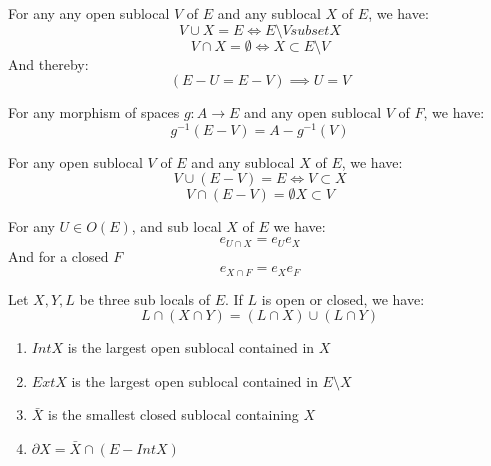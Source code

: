 \begin{lemma}
    \label{lem:properties_of_complements}
    For any any open sublocal $V$ of $E$ and any sublocal $X$ of $E$, we have:
    \[V \cup X = E \iff E \setminus V subset X\]
    \[V \cap X = \emptyset \iff X \subset E \setminus V\]
    And thereby:
    \[(E - U = E - V) \implies U = V\]
\end{lemma}

\begin{lemma}
    \label{lem:preimage_of_complements}
    For any morphism of spaces $g: A \to E$ and any open sublocal $V$ of $F$, we have:
    \[g^{-1}(E - V) = A - g^{-1}(V)\]
\end{lemma}

\begin{lemma}
    \label{lem:properties_of_complements_part_2}
    For any open sublocal $V$ of $E$ and any sublocal $X$ of $E$, we have:
    \[V \cup (E - V) = E \iff V \subset X \]
    \[V \cap (E - V) = \emptyset X \subset V\]
\end{lemma}


\begin{lemma}
    \label{lem:nucleus_and_intersection}
    For any $U \in O(E)$, and sub local $X$ of $E$ we have:
    \[e_{U \cap X} = e_Ue_X\]
    And for a closed $F$
    \[e_{X \cap F} = e_Xe_F\]
\end{lemma}

\begin{lemma}
    \label{lem:distribution_of_intersections_over_unions}
    Let $X, Y, L$ be three sub locals of $E$. If $L$ is open or closed, we have:
    \[L \cap (X \cap Y) = (L \cap X) \cup (L \cap Y)\]
\end{lemma}

\begin{definition}
    \label{def:further_topology}
    \begin{enumerate}
        \item $Int X$ is the largest open sublocal contained in $X$
        \item $Ext X$ is the largest open sublocal contained in $E \setminus X$
        \item $\bar{X}$ is the smallest closed sublocal containing $X$
        \item $\partial X = \bar{X} \cap (E - Int X)$
    \end{enumerate}
\end{definition}

